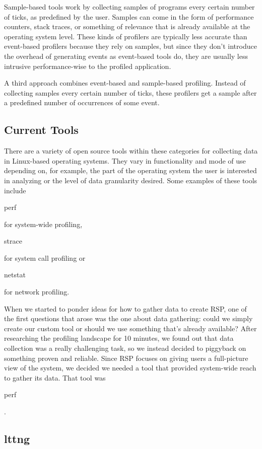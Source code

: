 \documentclass[10pt]{article}
\begin{document}
Sample-based tools work by collecting samples of programs every certain number
of ticks, as predefined by the user. Samples can come in the form of
performance counters, stack traces, or something of relevance that is already
available at the operating system level. These kinds of profilers are
typically less accurate than event-based profilers because they rely on
samples, but since they don't introduce the overhead of generating events as
event-based tools do, they are usually less intrusive performance-wise to the
profiled application.

A third approach combines event-based and sample-based profiling. Instead of
collecting samples every certain number of ticks, these profilers get a sample
after a predefined number of occurrences of some event.

\subsection{Current Tools}

There are a variety of open source tools within these categories for collecting data in Linux-based operating systems. They vary in functionality and mode of use depending on, for example, the part of the operating system the user is interested in analyzing or the level of data granularity desired. Some examples of these tools include \begin{tt}perf\end{tt} for system-wide profiling, \begin{tt}strace\end{tt} for system call profiling or \begin{tt}netstat\end{tt} for network profiling.

When we started to ponder ideas for how to gather data to create RSP, one of the first questions that arose was the one about data gathering: could we simply create our custom tool or should we use something that's already available? After researching the profiling landscape for 10 minutes, we found out that data collection was a really challenging task, so we instead decided to piggyback on something proven and reliable. Since RSP focuses on giving users a full-picture view of the system, we decided we needed a tool that provided system-wide reach to gather its data. That tool was \begin{tt}perf\end{tt}.

\subsection{lttng}
\end{document}
